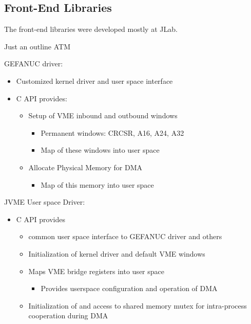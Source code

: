 \subsection{Front-End Libraries}

The front-end libraries were developed mostly at JLab.

Just an outline ATM

GEFANUC driver:
\begin{itemize}
\item Customized kernel driver and user space interface
\item C API provides:
   \begin{itemize}
   \item Setup of VME inbound and outbound windows
      \begin{itemize}
      \item Permanent windows: CRCSR, A16, A24, A32
      \item Map of these windows into user space
      \end{itemize}
   \item Allocate Physical Memory for DMA
      \begin{itemize}
      \item Map of this memory into user space
      \end{itemize}
   \end{itemize}
\end{itemize}

JVME User space Driver:
\begin{itemize}
\item C API provides
  \begin{itemize}
  \item common user space interface to GEFANUC driver and others
  \item Initialization of kernel driver and default VME windows
  \item Maps VME bridge registers into user space
    \begin{itemize}
    \item Provides userspace configuration and operation of DMA
    \end{itemize}
  \item Initialization of and access to shared memory mutex for intra-process cooperation during DMA
  \end{itemize}
\end{itemize}

